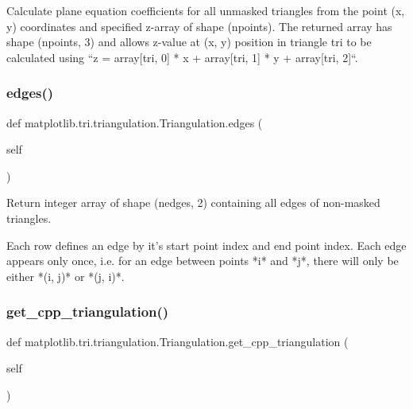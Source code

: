 \begin{DoxyVerb}Calculate plane equation coefficients for all unmasked triangles from
the point (x, y) coordinates and specified z-array of shape (npoints).
The returned array has shape (npoints, 3) and allows z-value at (x, y)
position in triangle tri to be calculated using
``z = array[tri, 0] * x  + array[tri, 1] * y + array[tri, 2]``.
\end{DoxyVerb}
 \mbox{\label{classmatplotlib_1_1tri_1_1triangulation_1_1Triangulation_a033d2a2db0698d6459a156864a55ba6f}} 
\subsubsection{\texorpdfstring{edges()}{edges()}}
{\footnotesize\ttfamily def matplotlib.\+tri.\+triangulation.\+Triangulation.\+edges (\begin{DoxyParamCaption}\item[{}]{self }\end{DoxyParamCaption})}

\begin{DoxyVerb}Return integer array of shape (nedges, 2) containing all edges of
non-masked triangles.

Each row defines an edge by it's start point index and end point
index.  Each edge appears only once, i.e. for an edge between points
*i*  and *j*, there will only be either *(i, j)* or *(j, i)*.
\end{DoxyVerb}
 \mbox{\label{classmatplotlib_1_1tri_1_1triangulation_1_1Triangulation_a2b9facd01b9df05f690a87a66169aff6}} 
\subsubsection{\texorpdfstring{get\+\_\+cpp\+\_\+triangulation()}{get\_cpp\_triangulation()}}
{\footnotesize\ttfamily def matplotlib.\+tri.\+triangulation.\+Triangulation.\+get\+\_\+cpp\+\_\+triangulation (\begin{DoxyParamCaption}\item[{}]{self }\end{DoxyParamCaption})}

